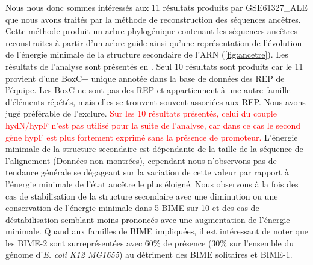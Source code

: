 \documentclass[12pt,a4paper]{report}
\begin{document}
\begin{onehalfspace}
\begin{figure}
{\label{fig:ancetre} }
\end{figure}

Nous nous donc sommes intéressés aux 11 résultats produits par GSE61327\_ALE que nous avons traités par la méthode de reconstruction des séquences ancêtres. Cette méthode produit un arbre phylogénique contenant les séquences ancêtres reconstruites à partir d'un arbre guide ainsi qu'une représentation de l'évolution de l'énergie minimale de la structure secondaire de l'ARN (\autoref{fig:ancetre}). Les résultats de l'analyse sont présentés en . Seul 10 résultats sont produits car le 11 provient d'une BoxC+ unique annotée dans la base de données des REP de l'équipe. Les BoxC ne sont pas des REP et appartiennent à une autre famille d’éléments répétés, mais elles se trouvent souvent associées aux REP. Nous avons jugé préférable de l'exclure. \textcolor{red}{Sur les 10 résultats présentés, celui du couple hydN/hypF n'est pas utilisé pour la suite de l'analyse, car dans ce cas le second gène hypF est plus fortement exprimé sans la présence de promoteur.} L'énergie minimale de la structure secondaire est dépendante de la taille de la séquence de l'alignement (Données non montrées), cependant nous n'observons pas de tendance générale se dégageant sur la variation de cette valeur par rapport à l'énergie minimale de l'état ancêtre le plus éloigné. Nous observons à la fois des cas de stabilisation de la structure secondaire avec une diminution ou une conservation de l'énergie minimale dans 5 BIME sur 10 et des cas de déstabilisation semblant moins prononcés avec une augmentation de l'énergie minimale. Quand aux familles de BIME impliquées, il est intéressant de noter que les BIME-2 sont surreprésentées avec 60\% de présence (30\% sur l'ensemble du génome d'\textit{E. coli K12 MG1655}) au détriment des BIME solitaires et BIME-1.


\end{onehalfspace}
\end{document}
